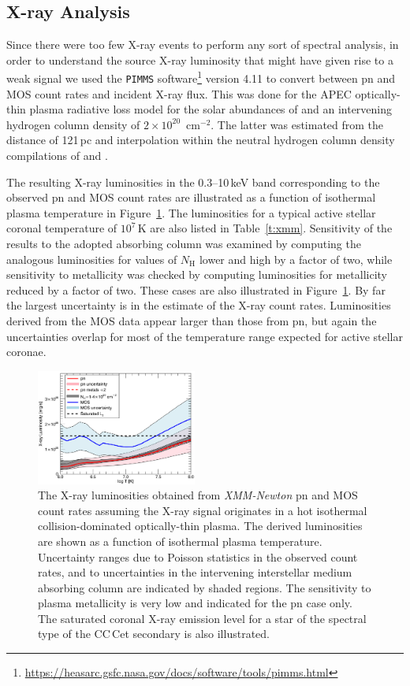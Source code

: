 \documentclass[fleqn,usenatbib]{mnras}
\begin{document}
\subsection{X-ray Analysis}
\label{sec:x-rays}
Since there were too few X-ray events to perform any sort of spectral analysis, in order to understand the source X-ray luminosity that might have given rise to a weak signal we used the {\tt PIMMS} software\footnote{\url{https://heasarc.gsfc.nasa.gov/docs/software/tools/pimms.html}} version 4.11 to convert between pn and MOS count rates and incident X-ray flux. This was done for the APEC optically-thin plasma radiative loss model \citep{fosteretal12-1} for the solar abundances of \citet{asplundetal09-1} and an intervening hydrogen column density of $2\times 10^{20}$~cm$^{-2}$. The latter was estimated from the distance of 121\,pc  \citep{gaia18-1} and interpolation within the neutral hydrogen column density compilations of \citet{Linsky.etal:19} and \citet{Gudennavar.etal:12}.  

The resulting X-ray luminosities in the 0.3--10\,keV band corresponding to the  observed pn and MOS count rates are illustrated as a function of isothermal plasma temperature in Figure~\ref{f:xmmlx}. The luminosities for a typical active stellar coronal temperature of $10^7$\,K are also listed in Table~\ref{t:xmm}. Sensitivity of the results to the adopted absorbing column was examined by computing the analogous luminosities for values of $N_\mathrm{H}$ lower and high by a factor of two, while sensitivity to metallicity was checked by computing luminosities for metallicity reduced by a factor of two. These cases are also illustrated in Figure~\ref{f:xmmlx}.  By far the largest uncertainty is in the estimate of the X-ray count rates. Luminosities derived from the MOS data appear larger than those from pn, but again the uncertainties overlap for most of the temperature range expected for active stellar coronae.

\begin{figure}
    \centering
    \includegraphics[width=0.47\textwidth]{cccet.png}
    \caption{The X-ray luminosities obtained from {\it XMM-Newton} pn and MOS count rates assuming the X-ray signal originates in a hot isothermal  collision-dominated  optically-thin plasma. The derived luminosities are shown as a function of isothermal plasma temperature. Uncertainty ranges due to Poisson statistics in the observed count rates, and to uncertainties in the intervening interstellar medium absorbing column are indicated by shaded regions. The sensitivity to plasma metallicity is very low and indicated for the pn case only. The saturated coronal X-ray emission level for a star of the spectral type of the CC\,Cet secondary is also illustrated.}
    \label{f:xmmlx}
\end{figure}
\end{document}
